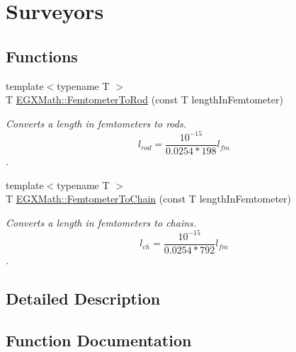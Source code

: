 \hypertarget{group___e_g_x_math-_conversions-_length_conversions-_femtometer-_surveyors}{}\section{Surveyors}
\label{group___e_g_x_math-_conversions-_length_conversions-_femtometer-_surveyors}
\subsection*{Functions}
\begin{DoxyCompactItemize}
\item 
{\footnotesize template$<$typename T $>$ }\\T \mbox{\hyperlink{group___e_g_x_math-_conversions-_length_conversions-_femtometer-_surveyors_ga29f133c21de5eca2aa12f88caf6da86f}{E\+G\+X\+Math\+::\+Femtometer\+To\+Rod}} (const T length\+In\+Femtometer)
\begin{DoxyCompactList}\small\item\em Converts a length in femtometers to rods. \[ l_{rod}= \frac{10^{-15}}{0.0254 * 198} l_{fm} \]. \end{DoxyCompactList}\item 
{\footnotesize template$<$typename T $>$ }\\T \mbox{\hyperlink{group___e_g_x_math-_conversions-_length_conversions-_femtometer-_surveyors_gac3220ddaefa889db44eb85690203f345}{E\+G\+X\+Math\+::\+Femtometer\+To\+Chain}} (const T length\+In\+Femtometer)
\begin{DoxyCompactList}\small\item\em Converts a length in femtometers to chains. \[ l_{ch}= \frac{10^{-15}}{0.0254 * 792} l_{fm} \]. \end{DoxyCompactList}\end{DoxyCompactItemize}


\subsection{Detailed Description}


\subsection{Function Documentation}
\mbox{\label{group___e_g_x_math-_conversions-_length_conversions-_femtometer-_surveyors_gac3220ddaefa889db44eb85690203f345}} 
